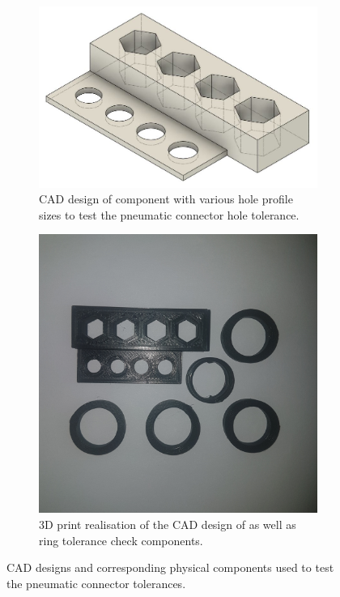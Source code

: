 \begin{figure}[H]
    \centering
    \begin{subfigure}[b]{0.45\textwidth}
        \includegraphics[width=\textwidth]{figures/202106/pneumatic-connector-tolerances.JPG}
        \caption{\ac{CAD} design of component with various hole profile sizes to test the pneumatic connector hole tolerance.}
        \label{fig:pneumatic-connector-tolerances-cad}
    \end{subfigure}
    \begin{subfigure}[b]{0.45\textwidth}
        \includegraphics[width=\textwidth]{figures/202106/pneumatic-connector-tolerances-photo.jpg}
        \caption{3D print realisation of the \ac{CAD} design of  as well as ring tolerance check components.}
        \label{fig:pneumatic-connector-tolerances-photo}
    \end{subfigure}
    \captionsetup{singlelinecheck = false, justification=justified}
    \caption{\ac{CAD} designs and corresponding physical components used to test the pneumatic connector tolerances.}
    \label{fig:pneumatic-connector-tolerances}
\end{figure}

